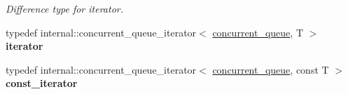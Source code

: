 \begin{DoxyCompactItemize}
\begin{DoxyCompactList}\small\item\em Difference type for iterator. \end{DoxyCompactList}\item 
\hypertarget{classtbb_1_1concurrent__queue_aadcbe074063ef4985fc70a8aaed7dae5}{}typedef internal\+::concurrent\+\_\+queue\+\_\+iterator$<$ \hyperlink{classtbb_1_1concurrent__queue}{concurrent\+\_\+queue}, T $>$ {\bfseries iterator}\label{classtbb_1_1concurrent__queue_aadcbe074063ef4985fc70a8aaed7dae5}

\item 
\hypertarget{classtbb_1_1concurrent__queue_a0f6a02c83112ca5c73317023be45f81a}{}typedef internal\+::concurrent\+\_\+queue\+\_\+iterator$<$ \hyperlink{classtbb_1_1concurrent__queue}{concurrent\+\_\+queue}, const T $>$ {\bfseries const\+\_\+iterator}\label{classtbb_1_1concurrent__queue_a0f6a02c83112ca5c73317023be45f81a}

\end{DoxyCompactItemize}

